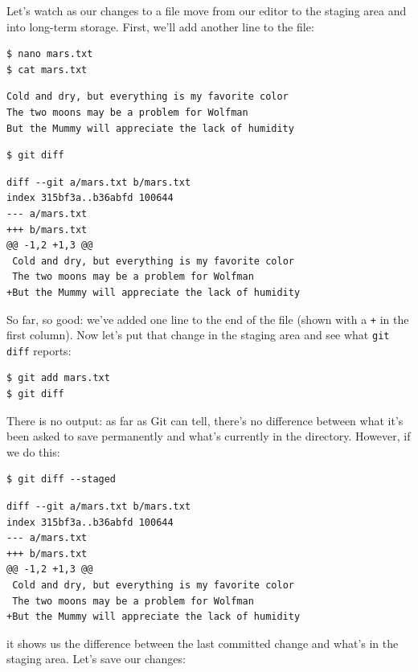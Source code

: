 \documentclass{book}
\begin{document}
Let's watch as our changes to a file move from our editor to the staging
area and into long-term storage. First, we'll add another line to the
file:

\begin{verbatim}
$ nano mars.txt
$ cat mars.txt
\end{verbatim}

\begin{verbatim}
Cold and dry, but everything is my favorite color
The two moons may be a problem for Wolfman
But the Mummy will appreciate the lack of humidity
\end{verbatim}

\begin{verbatim}
$ git diff
\end{verbatim}

\begin{verbatim}
diff --git a/mars.txt b/mars.txt
index 315bf3a..b36abfd 100644
--- a/mars.txt
+++ b/mars.txt
@@ -1,2 +1,3 @@
 Cold and dry, but everything is my favorite color
 The two moons may be a problem for Wolfman
+But the Mummy will appreciate the lack of humidity
\end{verbatim}

So far, so good: we've added one line to the end of the file (shown with
a \texttt{+} in the first column). Now let's put that change in the
staging area and see what \texttt{git diff} reports:

\begin{verbatim}
$ git add mars.txt
$ git diff
\end{verbatim}

There is no output: as far as Git can tell, there's no difference
between what it's been asked to save permanently and what's currently in
the directory. However, if we do this:

\begin{verbatim}
$ git diff --staged
\end{verbatim}

\begin{verbatim}
diff --git a/mars.txt b/mars.txt
index 315bf3a..b36abfd 100644
--- a/mars.txt
+++ b/mars.txt
@@ -1,2 +1,3 @@
 Cold and dry, but everything is my favorite color
 The two moons may be a problem for Wolfman
+But the Mummy will appreciate the lack of humidity
\end{verbatim}

it shows us the difference between the last committed change and what's
in the staging area. Let's save our changes:
\end{document}
